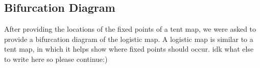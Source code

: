 \documentclass{article}
\begin{document}
\subsection{Bifurcation Diagram}
After providing the locations of the fixed points of a tent map, we were asked to provide a bifurcation diagram of the logistic map. A logistic map is similar to a tent map, in which it helps show where fixed points should occur. idk what else to write here so please continue:)
\end{document}
